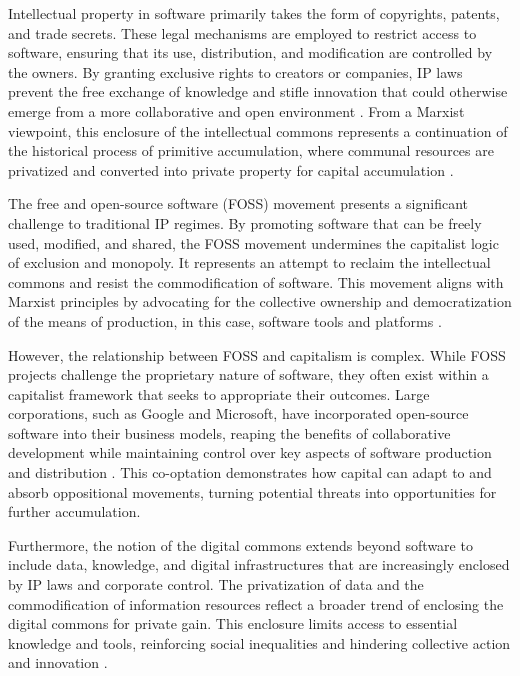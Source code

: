 \begin{refsection}
Intellectual property in software primarily takes the form of copyrights, patents, and trade secrets. These legal mechanisms are employed to restrict access to software, ensuring that its use, distribution, and modification are controlled by the owners. By granting exclusive rights to creators or companies, IP laws prevent the free exchange of knowledge and stifle innovation that could otherwise emerge from a more collaborative and open environment \cite[pp.~29-31]{stallman2010free}. From a Marxist viewpoint, this enclosure of the intellectual commons represents a continuation of the historical process of primitive accumulation, where communal resources are privatized and converted into private property for capital accumulation \cite[pp.~874-876]{marx2008capital}.

The free and open-source software (FOSS) movement presents a significant challenge to traditional IP regimes. By promoting software that can be freely used, modified, and shared, the FOSS movement undermines the capitalist logic of exclusion and monopoly. It represents an attempt to reclaim the intellectual commons and resist the commodification of software. This movement aligns with Marxist principles by advocating for the collective ownership and democratization of the means of production, in this case, software tools and platforms \cite[pp.~62-65]{bollier2014commons}.

However, the relationship between FOSS and capitalism is complex. While FOSS projects challenge the proprietary nature of software, they often exist within a capitalist framework that seeks to appropriate their outcomes. Large corporations, such as Google and Microsoft, have incorporated open-source software into their business models, reaping the benefits of collaborative development while maintaining control over key aspects of software production and distribution \cite[pp.~45-47]{birkinbine2020incorporated}. This co-optation demonstrates how capital can adapt to and absorb oppositional movements, turning potential threats into opportunities for further accumulation.

Furthermore, the notion of the digital commons extends beyond software to include data, knowledge, and digital infrastructures that are increasingly enclosed by IP laws and corporate control. The privatization of data and the commodification of information resources reflect a broader trend of enclosing the digital commons for private gain. This enclosure limits access to essential knowledge and tools, reinforcing social inequalities and hindering collective action and innovation \cite[pp.~140-143]{benkler2006wealth}.


\end{refsection}
